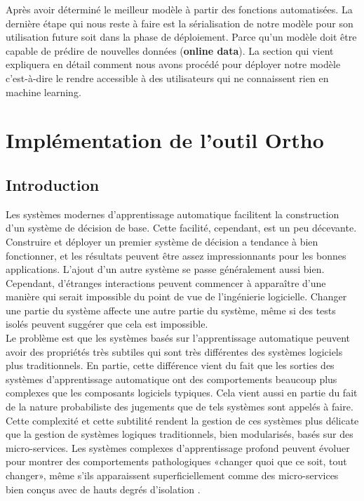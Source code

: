 \documentclass[12pt, french]{report}
\begin{document}
Après avoir déterminé le meilleur modèle à partir des fonctions automatisées. La dernière étape qui nous reste à faire est la sérialisation de notre modèle pour son utilisation future soit dans la phase de déploiement. Parce qu'un modèle doit être capable de prédire de nouvelles données (\textbf{online data}). La section qui vient expliquera en détail comment nous avons procédé pour déployer notre modèle c'est-à-dire le rendre accessible à des utilisateurs qui ne connaissent rien en machine learning.  \\ 



 

\chapter{Implémentation de l'outil Ortho} \label{chap:ortho}
\section{Introduction}

Les systèmes modernes d'apprentissage automatique facilitent la construction d'un système de décision de base. Cette facilité, cependant, est un peu décevante. Construire et déployer un premier système de décision a tendance à bien fonctionner, et les résultats peuvent être assez impressionnants pour les bonnes applications. L'ajout d'un autre système se passe généralement aussi bien. Cependant, d'étranges interactions peuvent commencer à apparaître d'une manière qui serait impossible du point de vue de l'ingénierie logicielle. Changer une partie du système affecte une autre partie du système, même si des tests isolés peuvent suggérer que cela est impossible. \\

Le problème est que les systèmes basés sur l'apprentissage automatique peuvent avoir des propriétés très subtiles qui sont très différentes des systèmes logiciels plus traditionnels. En partie, cette différence vient du fait que les sorties des systèmes d'apprentissage automatique ont des comportements beaucoup plus complexes que les composants logiciels typiques. Cela vient aussi en partie du fait de la nature probabiliste des jugements que de tels systèmes sont appelés à faire. \\

Cette complexité et cette subtilité rendent la gestion de ces systèmes plus délicate que la gestion de systèmes logiques traditionnels, bien modularisés, basés sur des micro-services. Les systèmes complexes d'apprentissage profond peuvent évoluer pour montrer des comportements pathologiques «changer quoi que ce soit, tout changer», même s'ils apparaissent superficiellement comme des micro-services bien conçus avec de hauts degrés d'isolation \cite{key7}.\\
\end{document}
